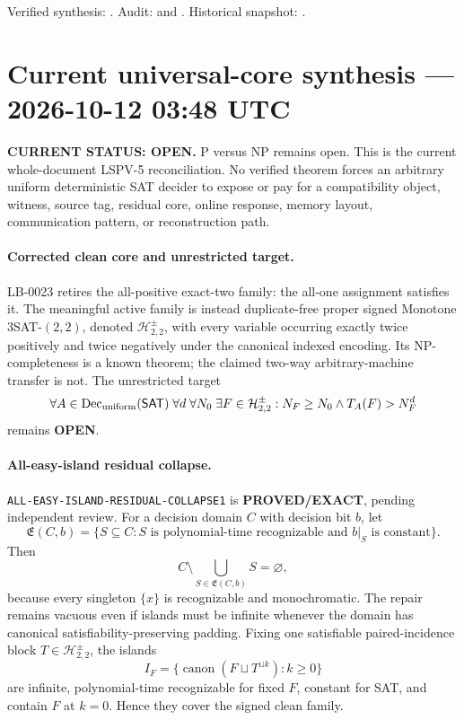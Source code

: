 \documentclass[11pt]{article}
\newcommand{\statusproved}{\textcolor{proved}{\textbf{PROVED/EXACT}}}
\newcommand{\statusopen}{\textcolor{openstatus}{\textbf{OPEN}}}
\begin{document}
Verified synthesis:
.
Audit:
and
.
Historical snapshot:
.

\clearpage


\section{Current universal-core synthesis --- 2026-10-12 03:48 UTC}

\begin{statusbox}
\textbf{CURRENT STATUS: OPEN.} P versus NP remains open.  This is the current
whole-document LSPV-5 reconciliation.  No verified theorem forces an arbitrary
uniform deterministic SAT decider to expose or pay for a compatibility
object, witness, source tag, residual core, online response, memory layout,
communication pattern, or reconstruction path.
\end{statusbox}

\paragraph{Corrected clean core and unrestricted target.}
LB-0023 retires the all-positive exact-two family: the all-one assignment
satisfies it.  The meaningful active family is instead duplicate-free proper
signed Monotone \(3\)SAT-\((2,2)\), denoted
\(\mathcal H^\pm_{2,2}\), with every variable occurring exactly twice
positively and twice negatively under the canonical indexed encoding.  Its
NP-completeness is a known theorem; the claimed two-way arbitrary-machine
transfer is not.  The unrestricted target
\[
 \forall A\in\operatorname{Dec}_{\rm uniform}(\mathsf{SAT})\;
 \forall d\;\forall N_0\;\exists F\in\mathcal H^\pm_{2,2}:
 N_F\ge N_0\land T_A(F)>N_F^d
\]
remains \statusopen.

\paragraph{All-easy-island residual collapse.}
\texttt{ALL-EASY-ISLAND-RESIDUAL-COLLAPSE1} is \statusproved, pending
independent review.  For a decision domain \(C\) with decision bit \(b\), let
\[
 \mathfrak E(C,b)=\{S\subseteq C:S\text{ is polynomial-time recognizable
 and }b|_S\text{ is constant}\}.
\]
Then
\[
 C\setminus\bigcup_{S\in\mathfrak E(C,b)}S=\varnothing,
\]
because every singleton \(\{x\}\) is recognizable and monochromatic.  The
repair remains vacuous even if islands must be infinite whenever the domain
has canonical satisfiability-preserving padding.  Fixing one satisfiable
paired-incidence block \(T\in\mathcal H^\pm_{2,2}\), the islands
\[
 I_F=\{\operatorname{canon}(F\sqcup T^{\sqcup k}):k\ge0\}
\]
are infinite, polynomial-time recognizable for fixed \(F\), constant for SAT,
and contain \(F\) at \(k=0\).  Hence they cover the signed clean family.
\end{document}
